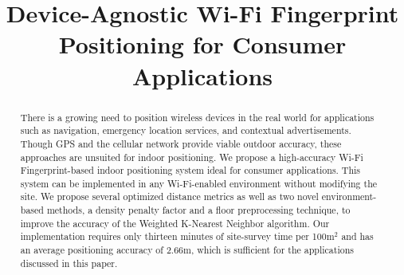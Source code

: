 \documentclass[conference]{IEEEtran}
\begin{document}
\title{Device-Agnostic Wi-Fi Fingerprint Positioning for Consumer Applications}

\author{
\and
{}
\and
{}
\and
{}
\and
{}
}

\maketitle

\begin{abstract}
There is a growing need to position wireless devices in the real world for applications such as navigation, emergency location services, and contextual advertisements. Though GPS and the cellular network provide viable outdoor accuracy, these approaches are unsuited for indoor positioning. We propose a high-accuracy Wi-Fi Fingerprint-based indoor positioning system ideal for consumer applications. This system can be implemented in any Wi-Fi-enabled environment without modifying the site. We propose several optimized distance metrics as well as two novel environment-based methods, a density penalty factor and a floor preprocessing technique, to improve the accuracy of the Weighted K-Nearest Neighbor algorithm. Our implementation requires only thirteen minutes of site-survey time per 100m$^2$ and has an average positioning accuracy of 2.66m, which is sufficient for the applications discussed in this paper.
\end{abstract}

\IEEEpeerreviewmaketitle
\end{document}
